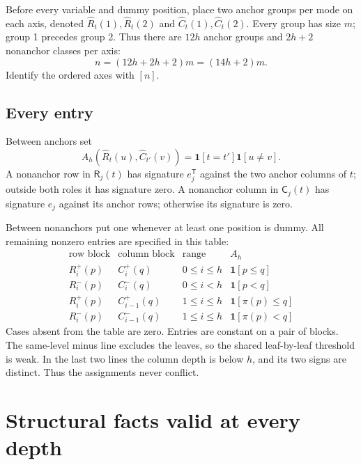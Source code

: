 \documentclass[11pt,a4paper]{article}
\theoremstyle{remark}
\newcommand{\one}{\mathbf{1}}
\newcommand{\Rrole}{\mathsf R}
\newcommand{\Crole}{\mathsf C}
\newcommand{\ancR}{\widehat R}
\newcommand{\ancC}{\widehat C}
\begin{document}
Before every variable and dummy position, place two anchor groups per
mode on each axis, denoted \(\ancR_t(1),\ancR_t(2)\) and
\(\ancC_t(1),\ancC_t(2)\). Every group has size \(m\); group 1 precedes
group 2. Thus there are \(12h\) anchor groups and \(2h+2\)
nonanchor classes per axis:
\[
n=(12h+2h+2)m=(14h+2)m.
\]
Identify the ordered axes with \([n]\).

\subsection{Every entry}
Between anchors set
\[
A_h(\ancR_t(u),\ancC_{t'}(v))
=\one[t=t']\one[u\ne v].
\]
A nonanchor row in \(\Rrole_j(t)\) has signature \(e_j^{\mathsf T}\)
against the two anchor columns of \(t\); outside both roles it has
signature zero. A nonanchor column in \(\Crole_j(t)\) has signature
\(e_j\) against its anchor rows; otherwise its signature is zero.

Between nonanchors put one whenever at least one position is dummy.
All remaining nonzero entries are specified in this table:
\begin{equation}\label{eq:entries}
\begin{array}{ccc|c}
\text{row block}&\text{column block}&\text{range}&A_h\\ \hline
R_i^+(p)&C_i^+(q)&0\le i\le h&\one[p\le q]\\
R_i^-(p)&C_i^-(q)&0\le i<h&\one[p<q]\\
R_i^+(p)&C_{i-1}^+(q)&1\le i\le h&\one[\pi(p)\le q]\\
R_i^-(p)&C_{i-1}^-(q)&1\le i\le h&\one[\pi(p)<q]
\end{array}
\end{equation}
Cases absent from the table are zero. Entries are constant on a pair
of blocks. The same-level minus line excludes the leaves, so the
shared leaf-by-leaf threshold is weak. In the last two lines the
column depth is below \(h\), and its two signs are distinct. Thus the
assignments never conflict.

\section{Structural facts valid at every depth}\label{sec:structural}
\end{document}
